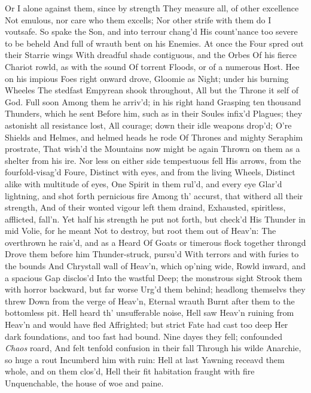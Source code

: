 \documentclass[11pt]{book}
\newcounter {last}
\begin{document}
Or I alone against them, since by strength 
They measure all, of other excellence 
Not emulous, nor care who them excells; 
Nor other strife with them do I voutsafe. 
\quad So spake the Son, and into terrour chang'd 
His count'nance too severe to be beheld 
And full of wrauth bent on his Enemies. 
At once the Four spred out their Starrie wings 
With dreadful shade contiguous, and the Orbes 
Of his fierce Chariot rowld, as with the sound 
Of torrent Floods, or of a numerous Host. 
Hee on his impious Foes right onward drove, 
Gloomie as Night; under his burning Wheeles 
The stedfast Empyrean shook throughout, 
All but the Throne it self of God.  Full soon 
Among them he arriv'd; in his right hand 
Grasping ten thousand Thunders, which he sent 
Before him, such as in their Soules infix'd 
Plagues; they astonisht all resistance lost, 
All courage; down their idle weapons drop'd; 
O're Shields and Helmes, and helmed heads he rode 
Of Thrones and mighty Seraphim prostrate, 
That wish'd the Mountains now might be again 
Thrown on them as a shelter from his ire. 
Nor less on either side tempestuous fell 
His arrows, from the fourfold-visag'd Foure, 
Distinct with eyes, and from the living Wheels, 
Distinct alike with multitude of eyes, 
One Spirit in them rul'd, and every eye 
Glar'd lightning, and shot forth pernicious fire 
Among th' accurst, that witherd all their strength, 
And of their wonted vigour left them draind, 
Exhausted, spiritless, afflicted, fall'n. 
Yet half his strength he put not forth, but check'd 
His Thunder in mid Volie, for he meant 
Not to destroy, but root them out of Heav'n: 
The overthrown he rais'd, and as a Heard 
Of Goats or timerous flock together throngd 
Drove them before him Thunder-struck, pursu'd 
With terrors and with furies to the bounds 
And Chrystall wall of Heav'n, which op'ning wide, 
Rowld inward, and a spacious Gap disclos'd 
Into the wastful Deep; the monstrous sight 
Strook them with horror backward, but far worse 
Urg'd them behind; headlong themselvs they threw 
Down from the verge of Heav'n, Eternal wrauth 
Burnt after them to the bottomless pit. 
\quad Hell heard th' unsufferable noise, Hell saw 
Heav'n ruining from Heav'n and would have fled 
Affrighted; but strict Fate had cast too deep 
Her dark foundations, and too fast had bound. 
Nine dayes they fell; confounded \textit{Chaos} roard, 
And felt tenfold confusion in their fall 
Through his wilde Anarchie, so huge a rout 
Incumberd him with ruin: Hell at last 
Yawning receavd them whole, and on them clos'd, 
Hell their fit habitation fraught with fire 
Unquenchable, the house of woe and paine. 
\end{document}
